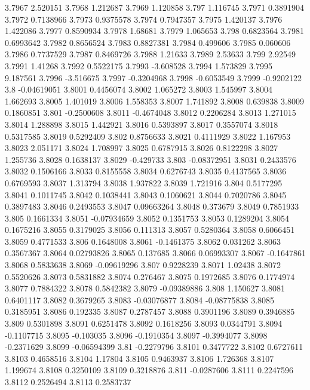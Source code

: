3.7967  2.520151
3.7968  1.212687
3.7969  1.120858
3.797  1.116745
3.7971  0.3891904
3.7972  0.7138966
3.7973  0.9375578
3.7974  0.7947357
3.7975  1.420137
3.7976  1.422086
3.7977  0.8590934
3.7978  1.68681
3.7979  1.065653
3.798  0.6823564
3.7981  0.6993642
3.7982  0.8656524
3.7983  0.8827381
3.7984  0.499606
3.7985  0.060606
3.7986  0.7737529
3.7987  0.8469726
3.7988  1.21633
3.7989  2.53633
3.799  2.92549
3.7991  1.41268
3.7992  0.5522175
3.7993  -3.608528
3.7994  1.573829
3.7995  9.187561
3.7996  -3.516675
3.7997  -0.3204968
3.7998  -0.6053549
3.7999  -0.9202122
3.8  -0.04619051
3.8001  0.4456074
3.8002  1.065272
3.8003  1.545997
3.8004  1.662693
3.8005  1.401019
3.8006  1.558353
3.8007  1.741892
3.8008  0.639838
3.8009  0.1860851
3.801  -0.2500608
3.8011  -0.4674048
3.8012  0.2206284
3.8013  1.271015
3.8014  1.288898
3.8015  1.442921
3.8016  0.5393897
3.8017  0.3557074
3.8018  0.5317585
3.8019  0.5292409
3.802  0.8756633
3.8021  0.4111929
3.8022  1.167953
3.8023  2.051171
3.8024  1.708997
3.8025  0.6787915
3.8026  0.8122298
3.8027  1.255736
3.8028  0.1638137
3.8029  -0.429733
3.803  -0.08372951
3.8031  0.2433576
3.8032  0.1506166
3.8033  0.8155558
3.8034  0.6276743
3.8035  0.4137565
3.8036  0.6769593
3.8037  1.313794
3.8038  1.937822
3.8039  1.721916
3.804  0.5177295
3.8041  0.1011745
3.8042  0.1038441
3.8043  0.1060621
3.8044  0.7020786
3.8045  0.3897483
3.8046  0.2493553
3.8047  0.09663264
3.8048  0.373679
3.8049  0.7851933
3.805  0.1661334
3.8051  -0.07934659
3.8052  0.1351753
3.8053  0.1289204
3.8054  0.1675216
3.8055  0.3179025
3.8056  0.111313
3.8057  0.5280364
3.8058  0.6066451
3.8059  0.4771533
3.806  0.1648008
3.8061  -0.1461375
3.8062  0.031262
3.8063  0.3567367
3.8064  0.02793826
3.8065  0.137685
3.8066  0.06993307
3.8067  -0.1647861
3.8068  0.5833638
3.8069  -0.09619296
3.807  0.9228239
3.8071  1.02438
3.8072  0.5520626
3.8073  0.5831882
3.8074  0.276467
3.8075  0.1972685
3.8076  0.1774974
3.8077  0.7884322
3.8078  0.5842382
3.8079  -0.09389886
3.808  1.150627
3.8081  0.6401117
3.8082  0.3679265
3.8083  -0.03076877
3.8084  -0.08775838
3.8085  0.3185951
3.8086  0.192335
3.8087  0.2787457
3.8088  0.3901196
3.8089  0.3946885
3.809  0.5301898
3.8091  0.6251478
3.8092  0.1618256
3.8093  0.0344791
3.8094  -0.1107715
3.8095  -0.103035
3.8096  -0.1910354
3.8097  -0.3994077
3.8098  -0.2371629
3.8099  -0.06594399
3.81  -0.2279796
3.8101  0.3477722
3.8102  0.6727611
3.8103  0.4658516
3.8104  1.17804
3.8105  0.9463937
3.8106  1.726368
3.8107  1.199674
3.8108  0.3250109
3.8109  0.3218876
3.811  -0.0287606
3.8111  0.2247596
3.8112  0.2526494
3.8113  0.2583737
